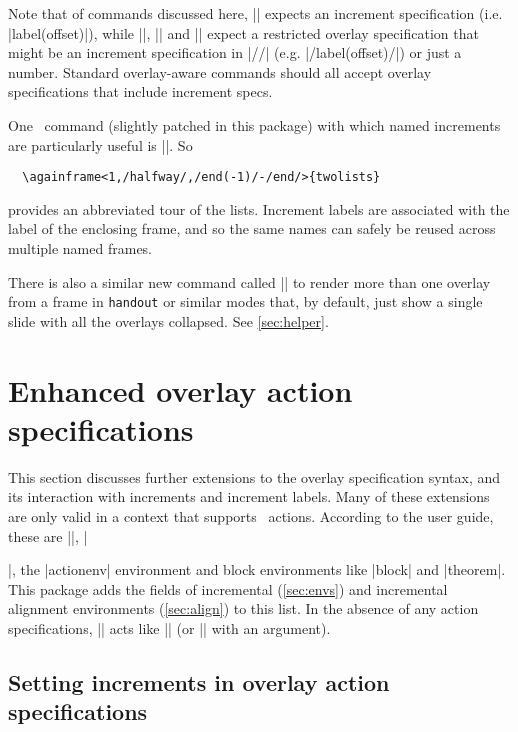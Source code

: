 \documentclass[a4paper]{ltxdoc}
\begin{document}
Note that of commands discussed here, |\incrref| expects an increment
specification (i.e. |label(offset)|), while |\resetincr|, |\fromincr| and
|\incrlabel| expect a restricted overlay specification that might be an
increment specification in |//| (e.g. |/label(offset)/|) or just a number.
Standard overlay-aware commands should all accept overlay specifications that
include increment specs.

One \beamer\ command (slightly patched in this package) with which named
increments are particularly useful is |\againframe|.  So \example
\begin{verbatim}
  \againframe<1,/halfway/,/end(-1)/-/end/>{twolists}
\end{verbatim}
provides an abbreviated tour of the lists.  Increment labels are associated with
the label of the enclosing frame, and so the same names can safely be reused
across multiple named frames.

There is also a similar new command called |\handoutframe| to render more than
one overlay from a frame in \texttt{handout} or similar modes that, by default,
just show a single slide with all the overlays collapsed.  See \cref{sec:helper}.

\section{Enhanced overlay action specifications}\label{sec:actions}

This section discusses further extensions to the overlay specification syntax,
and its interaction with increments and increment labels.
%
Many of these extensions are only valid in a context that supports
\beamer\ actions.  According to the user guide, these are |\action|, |\item|,
the |actionenv| environment and block environments like |block| and |theorem|.
This package adds the fields of incremental (\cref{sec:envs}) and incremental
alignment environments (\cref{sec:align}) to this list.  In the absence of any
action specifications, |\action| acts like |\uncover| (or |\onslide| with an
argument).


\subsection{Setting increments in overlay action specifications} \label{sec:actions:!}
\end{document}
